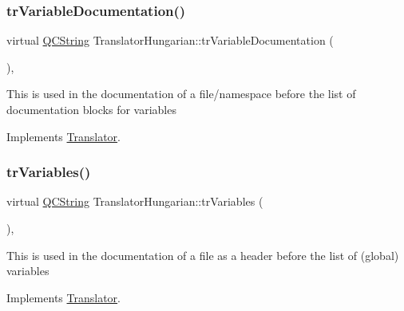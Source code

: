 \mbox{\label{class_translator_hungarian_acb3753e2a303782d62f6da66abeeda77}} 
\subsubsection{\texorpdfstring{trVariableDocumentation()}{trVariableDocumentation()}}
{\footnotesize\ttfamily virtual \mbox{\hyperlink{class_q_c_string}{Q\+C\+String}} Translator\+Hungarian\+::tr\+Variable\+Documentation (\begin{DoxyParamCaption}{ }\end{DoxyParamCaption})\hspace{0.3cm}{\ttfamily [inline]}, {\ttfamily [virtual]}}

This is used in the documentation of a file/namespace before the list of documentation blocks for variables 

Implements \mbox{\hyperlink{class_translator}{Translator}}.

\mbox{\label{class_translator_hungarian_a10b7826d4835fe38b09f3710c22d87cf}} 
\subsubsection{\texorpdfstring{trVariables()}{trVariables()}}
{\footnotesize\ttfamily virtual \mbox{\hyperlink{class_q_c_string}{Q\+C\+String}} Translator\+Hungarian\+::tr\+Variables (\begin{DoxyParamCaption}{ }\end{DoxyParamCaption})\hspace{0.3cm}{\ttfamily [inline]}, {\ttfamily [virtual]}}

This is used in the documentation of a file as a header before the list of (global) variables 

Implements \mbox{\hyperlink{class_translator}{Translator}}.

\mbox{\label{class_translator_hungarian_af1884dd0a8db1ea924bb37a593cfba49}} 
